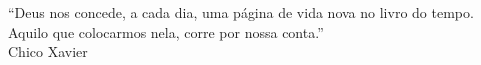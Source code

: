 \begin{epigrafe}
    \vspace*{\fill}
	\begin{flushright}
“Deus nos concede, a cada dia, uma página de vida nova no livro do tempo. \\Aquilo que colocarmos nela, corre por nossa conta.” \\Chico Xavier
	\end{flushright}
\end{epigrafe}